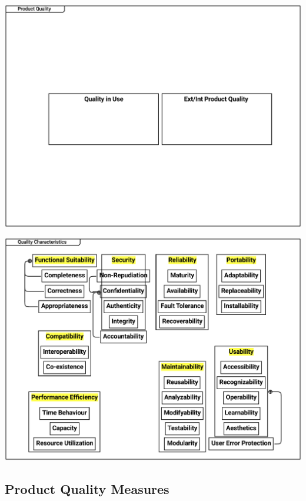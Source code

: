 \documentclass{article}
\begin{document}
\includegraphics[width= 1.0\linewidth]{quality_export/2_Product_Quality.pdf}


\includegraphics[width= 1.0\linewidth]{quality_export/4_Quality_Characteristics.pdf}


\subsection{Product Quality Measures}
\end{document}
